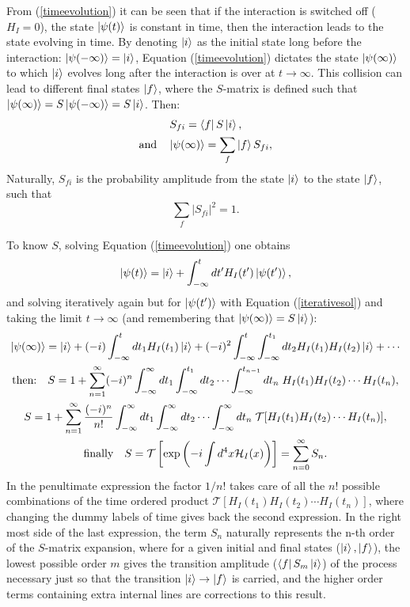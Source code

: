 From (\ref{timeevolution}) it can be seen that if the interaction is switched off ($H_I = 0$), the state $\ket{\psi(t)}$ is constant in time, then the interaction leads to the state evolving in time. By denoting $\ket{i}$ as the initial state long before the interaction: $\ket{\psi(-\infty)} = \ket{i}$, Equation (\ref{timeevolution}) dictates the state $\ket{\psi(\infty)}$ to which $\ket{i}$ evolves long after the interaction is over at $t\rightarrow\infty$. This collision can lead to different final states $\ket{f}$, where the $S$-matrix is defined such that $\ket{\psi(\infty)} = S\ket{\psi(-\infty)} = S\ket{i}$. Then:
\begin{gather*}
    S_{fi} = \bra{f}S\ket{i}, \\
    \textrm{and} \quad \ket{\psi(\infty)} = \sum_f \ket{f}S_{fi},
\end{gather*}
Naturally, $S_{fi}$ is the probability amplitude from the state $\ket{i}$ to the state $\ket{f}$, such that
\begin{equation*}
    \sum_f |S_{fi}|^2 = 1.
\end{equation*}

To know $S$, solving Equation (\ref{timeevolution}) one obtains
\begin{equation}
\label{iterativesol}
    \ket{\psi(t)} = \ket{i} + \int_{-\infty}^t dt'H_I(t')\ket{\psi(t')},
\end{equation}
and solving iteratively again but for $\ket{\psi(t')}$ with Equation (\ref{iterativesol}) and taking the limit $t \rightarrow \infty$ (and remembering that $\ket{\psi(\infty)} = S\ket{i}$):
\begin{gather*}
    \ket{\psi(\infty)} = \ket{i} + (-i)\int_{-\infty}^t dt_1H_I(t_1)\ket{i} + (-i)^2\int_{-\infty}^{t}\int_{-\infty}^{t_1}dt_2H_I(t_1)H_I(t_2)\ket{i} + \dotsm \\
    \textrm{then:} \quad S = 1 + \sum_{n=1}^{\infty}(-i)^n\int_{-\infty}^{\infty}dt_1\int_{-\infty}^{t_1}dt_2 \dotsm \int_{-\infty}^{t_{n-1}} dt_n \; H_I(t_1) H_I(t_2) \dotsm H_I(t_n), \\
    S = 1 + \sum_{n=1}^{\infty} \dfrac{(-i)^n}{n!} \int_{-\infty}^{\infty}dt_1 \int_{-\infty}^{\infty}dt_2 \dotsm \int_{-\infty}^{\infty} dt_n \; \mathcal{T}[H_I(t_1) H_I(t_2) \dotsm H_I(t_n)], \\
    \textrm{finally} \quad S = \mathcal{T}\left[ \textrm{exp} \left( -i\int d^4x \mathcal{H}_I(x) \right) \right] = \sum_{n=0}^{\infty}S_n.
\end{gather*}
In the penultimate expression the factor $1/n!$ takes care of all the $n!$ possible combinations of the time ordered product $\mathcal{T}[H_I(t_1) H_I(t_2) \dotsm H_I(t_n)]$, where changing the dummy labels of time gives back the second expression. In the right most side of the last expression, the term $S_n$ naturally represents the n-th order of the $S$-matrix expansion, where for a given initial and final states ($\ket{i},\ket{f}$), the lowest possible order $m$ gives the transition amplitude ($\bra{f}S_m\ket{i}$) of the process necessary just so that the transition $\ket{i}\rightarrow\ket{f}$ is carried, and the higher order terms containing extra internal lines are corrections to this result.

